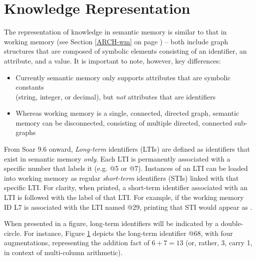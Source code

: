 \section{Knowledge Representation}
\label{SMEM-kr}

The representation of knowledge in semantic memory is similar to that in working memory (see Section \ref{ARCH-wm} on page \pageref{ARCH-wm}) -- both include graph structures that are composed of symbolic elements consisting of an identifier, an attribute, and a value. 
It is important to note, however, key differences:

\begin{itemize}

\item 
Currently semantic memory only supports attributes that are symbolic constants \\
(string, integer, or decimal), but \emph{not} attributes that are identifiers

\item 
Whereas working memory is a single, connected, directed graph, semantic memory can be disconnected, consisting of multiple directed, connected sub-graphs

\end{itemize}

From Soar 9.6 onward, \emph{Long-term} identifiers (LTIs) are defined as identifiers that exist in semantic memory \emph{only}.
Each LTI is permanently associated with a specific number that labels it (e.g. {@}5 or {@}7).
Instances of an LTI can be loaded into working memory as regular \emph{short-term} identifiers (STIs) linked with that specific LTI.
For clarity, when printed, a short-term identifier associated with an LTI is followed with the label of that LTI.
For example, if the working memory ID L7 is associated with the LTI named {@}29, printing that STI would appear as . 

When presented in a figure, long-term identifiers will be indicated by a double-circle. 
For instance, Figure \ref{fig:smem-concept} depicts the long-term identifier {@}68, with four augmentations, representing the addition fact of ${6+7=13}$ (or, rather, 3, carry 1, in context of multi-column arithmetic).

\begin{figure}
\label{fig:smem-concept}
\end{figure}


